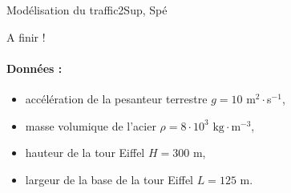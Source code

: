 \begin{exercise}{Modélisation du traffic}{2}{Sup, Spé}
\begin{questions}
    A finir !
    
\end{questions}

\paragraph{Données :}
\begin{itemize}
    \item accélération de la pesanteur terrestre $g = 10$ m$^2\cdot$s$^{-1}$,
    \item masse volumique de l'acier $\rho = 8\cdot 10^3$ $\mathrm{kg\cdot m^{-3}}$,
    \item hauteur de la tour Eiffel $H = 300$ m,
    \item largeur de la base de la tour Eiffel $L = 125$ m.
\end{itemize}
\end{exercise}
